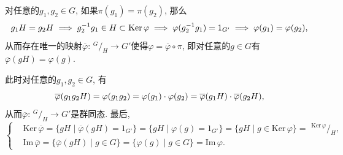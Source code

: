 \documentclass[UTF8]{ctexart}
\begin{document}

对任意的$g_1,g_2\in G$, 如果$\pi(g_1)=\pi(g_2)$, 那么
\vspace{3pt}
\[
    g_1H=g_2H\implies g_2^{-1}g_1\in H\subset\mathrm{Ker}\,\varphi\implies
    \varphi(g_2^{-1}g_1)=1_{G'}\implies\varphi(g_1)=\varphi(g_2),\\[3pt]
\]
从而存在唯一的映射$\overline{\varphi}:\,\!^{\displaystyle G}\!/_{\displaystyle H}
\to G'$使得$\varphi=\overline{\varphi}\circ\pi$, 即对任意的$g\in G$有
$\overline{\varphi}(gH)=\varphi(g)$.

此时对任意的$g_1,g_2\in G$, 有
\[
    \overline{\varphi}(g_1g_2H)=\varphi(g_1g_2)=\varphi(g_1)\cdot\varphi(g_2)=
    \overline{\varphi}(g_1H)\cdot\overline{\varphi}(g_2H),\\[3pt]
\]
从而$\overline{\varphi}:\,\!^{\displaystyle G}\!/_{\displaystyle H}
\to G'$是群同态. 最后,
\vspace{5pt}
\begin{equation*}\left\{\begin{aligned}
    &\mathrm{Ker}\,\overline{\varphi}=\{gH\mid\overline{\varphi}(gH)=1_{G'}\}=
    \{gH\mid\varphi(g)=1_{G'}\}=\{gH\mid g\in\mathrm{Ker}\,\varphi\}=\,
    \,\!^{\displaystyle\mathrm{Ker}\,\varphi}\!/_{\displaystyle H},\\[3pt]
    &\mathrm{Im}\,\overline{\varphi}=\{\overline{\varphi}(gH)\mid g\in G\}=
    \{\varphi(g)\mid g\in G\}=\mathrm{Im}\,\varphi.
\end{aligned}\right.\tag*{\qedsymbol}\end{equation*}
\end{document}
